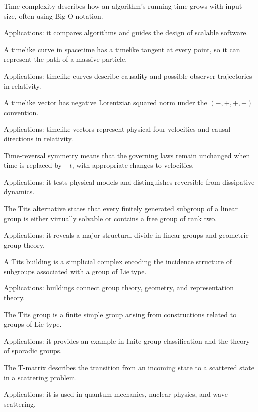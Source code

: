 Time complexity describes how an algorithm's running time grows with input size, often using Big O notation. \par\noindent Applications: it compares algorithms and guides the design of scalable software.

A timelike curve in spacetime has a timelike tangent at every point, so it can represent the path of a massive particle. \par\noindent Applications: timelike curves describe causality and possible observer trajectories in relativity.

A timelike vector has negative Lorentzian squared norm under the $(-,+,+,+)$ convention. \par\noindent Applications: timelike vectors represent physical four-velocities and causal directions in relativity.

Time-reversal symmetry means that the governing laws remain unchanged when time is replaced by $-t$, with appropriate changes to velocities. \par\noindent Applications: it tests physical models and distinguishes reversible from dissipative dynamics.

The Tits alternative states that every finitely generated subgroup of a linear group is either virtually solvable or contains a free group of rank two. \par\noindent Applications: it reveals a major structural divide in linear groups and geometric group theory.

A Tits building is a simplicial complex encoding the incidence structure of subgroups associated with a group of Lie type. \par\noindent Applications: buildings connect group theory, geometry, and representation theory.

The Tits group is a finite simple group arising from constructions related to groups of Lie type. \par\noindent Applications: it provides an example in finite-group classification and the theory of sporadic groups.

The T-matrix describes the transition from an incoming state to a scattered state in a scattering problem. \par\noindent Applications: it is used in quantum mechanics, nuclear physics, and wave scattering.

